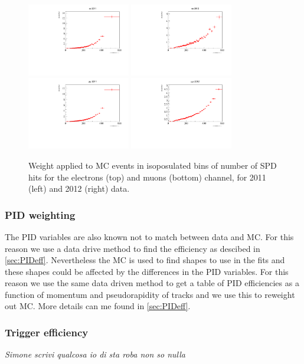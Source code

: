 \begin{figure}[h!]
\centering
\includegraphics[width=0.40\textwidth]{RKst/figs/Weights/EE_wSPD_2011.pdf}
\includegraphics[width=0.40\textwidth]{RKst/figs/Weights/EE_wSPD_2012.pdf} \\
\includegraphics[width=0.40\textwidth]{RKst/figs/Weights/MM_wSPD_2011.pdf}
\includegraphics[width=0.40\textwidth]{RKst/figs/Weights/MM_wSPD_2012.pdf}
\caption{Weight applied to MC events in isoposulated bins of number of SPD hits for the electrons (top) and muons (bottom) channel, for 2011 (left) and 2012 (right) data. }
\label{fig:SPDW}
\end{figure}

\subsubsection{PID weighting}

The PID variables are also known not to match between data and MC. For this reason we use a data drive method to find the efficiency as
descibed in \ref{sec:PIDeff}. Nevertheless the MC is used to find shapes to use in the fits and these shapes could be affected
by the differences in the PID variables. For this reason we use the same data driven method to get a table of PID efficiencies
as a function of momentum and pseudorapidity of tracks and we use this to reweight out MC. More details can me found in \ref{sec:PIDeff}.

\subsubsection{Trigger efficiency}

{\em Simone scrivi qualcosa io di sta roba non so nulla}



\clearpage
